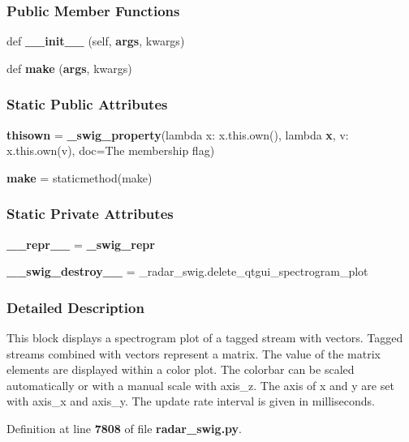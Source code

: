 \subsubsection*{Public Member Functions}
\begin{DoxyCompactItemize}
\item 
def {\bf \+\_\+\+\_\+init\+\_\+\+\_\+} (self, {\bf args}, kwargs)
\item 
def {\bf make} ({\bf args}, kwargs)
\end{DoxyCompactItemize}
\subsubsection*{Static Public Attributes}
\begin{DoxyCompactItemize}
\item 
{\bf thisown} = {\bf \+\_\+swig\+\_\+property}(lambda x\+: x.\+this.\+own(), lambda {\bf x}, v\+: x.\+this.\+own(v), doc=\textquotesingle{}The membership flag\textquotesingle{})
\item 
{\bf make} = staticmethod(make)
\end{DoxyCompactItemize}
\subsubsection*{Static Private Attributes}
\begin{DoxyCompactItemize}
\item 
{\bf \+\_\+\+\_\+repr\+\_\+\+\_\+} = {\bf \+\_\+swig\+\_\+repr}
\item 
{\bf \+\_\+\+\_\+swig\+\_\+destroy\+\_\+\+\_\+} = \+\_\+radar\+\_\+swig.\+delete\+\_\+qtgui\+\_\+spectrogram\+\_\+plot
\end{DoxyCompactItemize}


\subsubsection{Detailed Description}
\begin{DoxyVerb}This block displays a spectrogram plot of a tagged stream with vectors. Tagged streams combined with vectors represent a matrix. The value of the matrix elements are displayed within a color plot. The colorbar can be scaled automatically or with a manual scale with axis_z. The axis of x and y are set with axis_x and axis_y. The update rate interval is given in milliseconds.\end{DoxyVerb}
 

Definition at line {\bf 7808} of file {\bf radar\+\_\+swig.\+py}.



